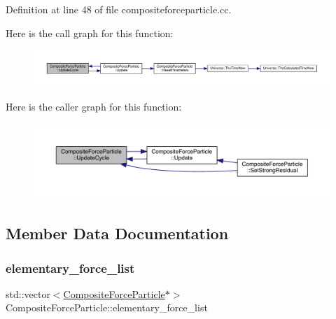 Definition at line 48 of file compositeforceparticle.\+cc.

Here is the call graph for this function\+:
\nopagebreak
\begin{figure}[H]
\begin{center}
\leavevmode
\includegraphics[width=350pt]{class_composite_force_particle_a578d87e48246ef83f39dce070dff541e_cgraph}
\end{center}
\end{figure}
Here is the caller graph for this function\+:
\nopagebreak
\begin{figure}[H]
\begin{center}
\leavevmode
\includegraphics[width=350pt]{class_composite_force_particle_a578d87e48246ef83f39dce070dff541e_icgraph}
\end{center}
\end{figure}


\subsection{Member Data Documentation}
\mbox{\label{class_composite_force_particle_a00d5ce181c8d4b1df0d46ff23a8fb1b8}} 
\subsubsection{\texorpdfstring{elementary\+\_\+force\+\_\+list}{elementary\_force\_list}}
{\footnotesize\ttfamily std\+::vector$<$\hyperlink{class_composite_force_particle}{Composite\+Force\+Particle}$\ast$$>$ Composite\+Force\+Particle\+::elementary\+\_\+force\+\_\+list\hspace{0.3cm}{\ttfamily [protected]}}



